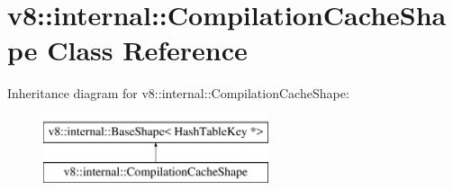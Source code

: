 \hypertarget{classv8_1_1internal_1_1CompilationCacheShape}{}\section{v8\+:\+:internal\+:\+:Compilation\+Cache\+Shape Class Reference}
\label{classv8_1_1internal_1_1CompilationCacheShape}
Inheritance diagram for v8\+:\+:internal\+:\+:Compilation\+Cache\+Shape\+:\begin{figure}[H]
\begin{center}
\leavevmode
\includegraphics[height=2.000000cm]{classv8_1_1internal_1_1CompilationCacheShape}
\end{center}
\end{figure}
